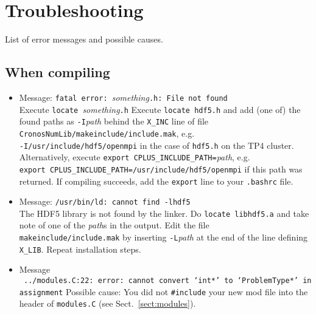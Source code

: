 \section{Troubleshooting}
\label{sec:trouble_ahead}

List of error messages and possible causes.

\subsection{When compiling}

\begin{itemize}
\item Message:
  \verb+fatal error: +\textit{something}\verb+.h: File not found+ \\
  Execute \verb+locate +\textit{something}\verb+.h+  Execute \verb+locate hdf5.h+
  and add (one of) the found paths as
  \verb+-I+{\em path} behind the \verb+X_INC+ line of file
  \verb+CronosNumLib/makeinclude/include.mak+, e.g. \\
  \verb+-I/usr/include/hdf5/openmpi+ in the case of \verb+hdf5.h+ on the TP4 cluster. \\
  Alternatively, execute \verb+export CPLUS_INCLUDE_PATH=+\textit{path},
  e.g. \\ \verb+export CPLUS_INCLUDE_PATH=/usr/include/hdf5/openmpi+
  if this path was returned. If compiling succeeds, add the {\tt export} line
  to your {\tt .bashrc} file.
\item Message: \verb+/usr/bin/ld: cannot find -lhdf5+ \\
  The HDF5 library is not found by the linker. Do
  \verb+locate libhdf5.a+ and take note of one of the \textit{path}s in
  the output. Edit the file \verb+makeinclude/include.mak+ by inserting
  {\tt -L}\textit{path} at the end of the line defining \verb+X_LIB+.
  Repeat installation steps.  
\item Message \\
\verb+ ../modules.C:22: error: cannot convert ‘int*’ to ‘ProblemType*’ in assignment+
  Possible cause: You did not \verb+#include+ your new mod file into the header
  of {\tt modules.C} (see Sect.~\ref{sect:modules}).
\end{itemize}


